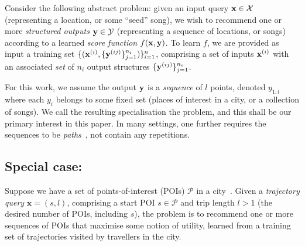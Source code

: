 Consider the following abstract problem:
given an input query $\mathbf{x} \in \mathcal{X}$ (representing \eg a location, or some ``seed'' song),
we wish to recommend one or more \emph{structured outputs} $\mathbf{y} \in \mathcal{Y}$ (representing \eg a sequence of locations, or songs)
according to a learned \emph{score function} $f(\mathbf{x},\mathbf{y})$.
To learn $f$,
we are provided as input a training set
$\{ ( \mathbf{x}^{({i})}, \{ \mathbf{y}^{({ij})} \}_{j=1}^{n_i} ) \}_{i=1}^{n}$,
comprising a set %
of inputs $\mathbf{x}^{({i})}$ with an associated \emph{set} of $n_i$ output structures $\{ \mathbf{y}^{({ij})} \}_{j=1}^{n_i}$.

For this work, we assume the output $\mathbf{y}$ is a \emph{sequence} of $l$ points, denoted $y_{1:l}$
where each $y_i$ belongs to some fixed set (\eg places of interest in a city, or a collection of songs).
We call the resulting specialisation the \emph{{\seqrec}} problem,
and this shall be our primary interest in this paper.
In many settings, one further requires the sequences to be \emph{paths}~\cite{west2001introduction}, \ie not contain any repetitions.





\subsection{Special case: {\trajrec}}

Suppose we have a set of points-of-interest (POIs) $\mathcal{P}$ in a city~\cite{bao2015recommendations,zheng2015trajectory,zheng2014urban}.
Given a \emph{trajectory query} $\mathbf{x} = (s, l)$,
comprising a start POI $s \in \mathcal{P}$ and trip length
$l \!>\! 1$ (\ie the desired number of POIs, including $s$),
the \emph{\trajrec} problem is to
recommend one or more sequences of POIs %
that maximise some notion of utility,
learned from a training set
of trajectories visited by travellers in the city.

